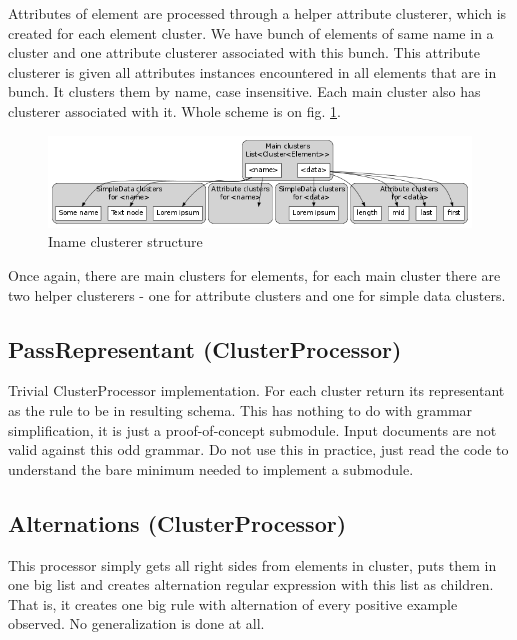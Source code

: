 \documentclass[a4paper,10pt,oneside]{article}
\newcommand{\code}[1]{\texttt{\StrSubstitute{#1}{.}{.\.}}}
\def\.{\discretionary{}{}{}}
\begin{document}
Attributes of element are processed through a helper attribute clusterer, which is created for each element cluster.
We have bunch of elements of same name in a cluster and one attribute clusterer associated with this bunch.
This attribute clusterer is given all attributes instances encountered in all elements that are in bunch.
It clusters them by name, case insensitive.
Each main cluster also has \code{SimpleData} clusterer associated with it.
Whole scheme is on fig. \ref{clusterer_structure}.
\begin{figure}[tpb]
	\centering\includegraphics[scale=1]{clusterer_structure}
	\caption{Iname clusterer structure} \label{clusterer_structure}
\end{figure}

Once again, there are main clusters for elements, for each main cluster there are two helper clusterers - one for attribute clusters and one for simple data clusters.

\subsection{PassRepresentant (ClusterProcessor)} \label{section_PassRepresentant}
Trivial ClusterProcessor implementation. For each cluster return its representant as the rule to be in resulting schema.
This has nothing to do with grammar simplification, it is just a proof-of-concept submodule.
Input documents are not valid against this odd grammar.
Do not use this in practice, just read the code to understand the bare minimum needed to implement a submodule.

\subsection{Alternations (ClusterProcessor)} \label{section_Alternations}
This processor simply gets all right sides from elements in cluster, puts them in one big list and creates alternation regular expression with this list as children.
That is, it creates one big rule with alternation of every positive example observed.
No generalization is done at all.
\end{document}
